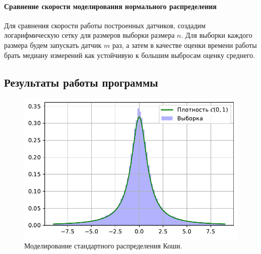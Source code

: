 \documentclass[16pt]{article}
\begin{document}
\paragraph{Сравнение скорости моделирования нормального распределения} Для сравнения скорости работы построенных датчиков, создадим логарифмическую сетку для размеров выборки размера $n$. Для выборки каждого размера будем запускать датчик $m$ раз, а затем в качестве оценки времени работы брать медиану измерений как устойчивую к большим выбросам оценку среднего.
\subsection{Результаты работы программы}
\begin{figure}[h]
	\center
	\includegraphics[scale=0.7]{4_1.pdf}
	\caption{Моделирование стандартного распределения Коши.}
\end{figure}
\end{document}
